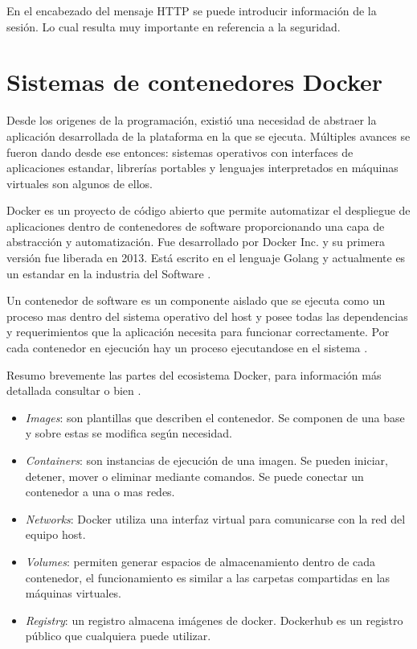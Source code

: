 En el encabezado del mensaje HTTP se puede introducir información de la sesión. Lo cual resulta muy importante en referencia a la seguridad. 


\section{Sistemas de contenedores Docker}
\label{sec:Docker}

Desde los origenes de la programación, existió una necesidad de abstraer la aplicación desarrollada de la plataforma en la que se ejecuta. Múltiples avances se fueron dando desde ese entonces: sistemas operativos con interfaces de aplicaciones estandar, librerías portables y lenguajes interpretados en máquinas virtuales son algunos de ellos.

Docker es un proyecto de código abierto que permite automatizar el despliegue de aplicaciones dentro de contenedores de software proporcionando una capa de abstracción y automatización. Fue desarrollado por Docker Inc. y su primera versión fue liberada en 2013. Está escrito en el lenguaje Golang y actualmente es un estandar en la industria del Software \citep{WEBSITE:8}.

Un contenedor de software es un componente aislado que se ejecuta como un proceso mas dentro del sistema operativo del host y posee todas las dependencias y requerimientos que la aplicación necesita para funcionar correctamente. Por cada contenedor en ejecución hay un proceso ejecutandose en el sistema \citep{WEBSITE:8}.

Resumo brevemente las partes del ecosistema Docker, para información más detallada consultar\citep{WEBSITE:8} o bien \citep{WEBSITE:9}.

\begin{itemize}
\item \textit{Images}: son plantillas que describen el contenedor. Se componen de una base y sobre estas se modifica según necesidad.
\item \textit{Containers}: son instancias de ejecución de una imagen. Se pueden iniciar, detener, mover o eliminar mediante comandos. Se puede conectar un contenedor a una o mas redes.
\item \textit{Networks}: Docker utiliza una interfaz virtual para comunicarse con la red del equipo host.
\item \textit{Volumes}: permiten generar espacios de almacenamiento dentro de cada contenedor, el funcionamiento es similar a las carpetas compartidas en las máquinas virtuales.
\item \textit{Registry}: un registro almacena imágenes de docker. Dockerhub es un registro público que cualquiera puede utilizar.
\end{itemize}

